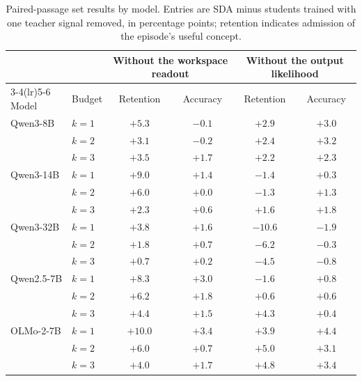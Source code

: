 \begin{table}[t]
\centering
\caption{Paired-passage set results by model. Entries are SDA minus students trained with one teacher
signal removed, in percentage points; retention indicates admission of the episode's useful concept.}
\label{tab:crosspairmodels}
\footnotesize
\setlength{\tabcolsep}{2pt}
\begin{tabular}{llcccc}
\toprule
& & \multicolumn{2}{c}{Without the workspace readout} & \multicolumn{2}{c}{Without the output likelihood} \\
\cmidrule(lr){3-4}\cmidrule(lr){5-6}
Model & Budget & Retention & Accuracy & Retention & Accuracy \\
\midrule
Qwen3-8B & $k=1$ & $+5.3$ & $-0.1$ & $+2.9$ & $+3.0$ \\
 & $k=2$ & $+3.1$ & $-0.2$ & $+2.4$ & $+3.2$ \\
 & $k=3$ & $+3.5$ & $+1.7$ & $+2.2$ & $+2.3$ \\
\addlinespace
Qwen3-14B & $k=1$ & $+9.0$ & $+1.4$ & $-1.4$ & $+0.3$ \\
 & $k=2$ & $+6.0$ & $+0.0$ & $-1.3$ & $+1.3$ \\
 & $k=3$ & $+2.3$ & $+0.6$ & $+1.6$ & $+1.8$ \\
\addlinespace
Qwen3-32B & $k=1$ & $+3.8$ & $+1.6$ & $-10.6$ & $-1.9$ \\
 & $k=2$ & $+1.8$ & $+0.7$ & $-6.2$ & $-0.3$ \\
 & $k=3$ & $+0.7$ & $+0.2$ & $-4.5$ & $-0.8$ \\
\addlinespace
Qwen2.5-7B & $k=1$ & $+8.3$ & $+3.0$ & $-1.6$ & $+0.8$ \\
 & $k=2$ & $+6.2$ & $+1.8$ & $+0.6$ & $+0.6$ \\
 & $k=3$ & $+4.4$ & $+1.5$ & $+4.3$ & $+0.4$ \\
\addlinespace
OLMo-2-7B & $k=1$ & $+10.0$ & $+3.4$ & $+3.9$ & $+4.4$ \\
 & $k=2$ & $+6.0$ & $+0.7$ & $+5.0$ & $+3.1$ \\
 & $k=3$ & $+4.0$ & $+1.7$ & $+4.8$ & $+3.4$ \\
\bottomrule
\end{tabular}
\end{table}

